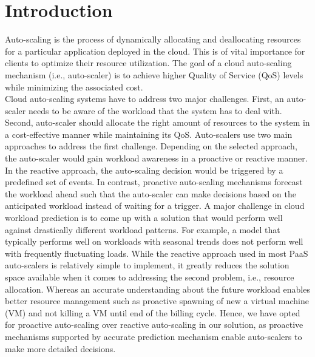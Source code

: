 \section{Introduction}
Auto-scaling is the process of dynamically allocating and deallocating resources for a particular application deployed in the cloud. This is of vital importance for clients to optimize their resource utilization. The goal of a cloud auto-scaling mechanism (i.e., auto-scaler) is to achieve higher Quality of Service (QoS) levels while minimizing the associated cost.\\

Cloud auto-scaling systems have to address two major challenges. First, an auto-scaler needs to be aware of the workload that the system has to deal with. Second, auto-scaler should allocate the right amount of resources to the system in a cost-effective manner while maintaining its QoS. Auto-scalers use two main approaches to address the first challenge. Depending on the selected approach, the auto-scaler would gain workload awareness in a proactive or reactive manner. In the reactive approach, the auto-scaling decision would be triggered by a predefined set of events. In contrast, proactive auto-scaling mechanisms forecast the workload ahead such that the auto-scaler can make decisions based on the anticipated workload instead of waiting for a trigger. A major challenge in cloud workload prediction is to come up with a solution that would perform well against drastically different workload patterns. For example, a model that typically performs well on workloads with seasonal trends does not perform well with frequently fluctuating loads. While the reactive approach used in most PaaS auto-scalers is relatively simple to implement, it greatly reduces the solution space available when it comes to addressing the second problem, i.e., resource allocation. Whereas an accurate understanding about the future workload enables better resource management such as proactive spawning of new a virtual machine (VM) and not killing a VM until end of the billing cycle. Hence, we have opted for proactive auto-scaling over reactive auto-scaling in our solution, as proactive mechanisms supported by accurate prediction mechanism enable auto-scalers to make more detailed decisions. \\

